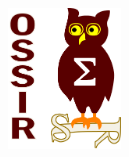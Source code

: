 \begin{figure}[h]
\begin{center}
\hfill
\parbox{3cm}{\includegraphics[width=3cm]{_images/ossir}}
\end{center}
\vfill
\begin{center}
\end{center}
\end{figure}

